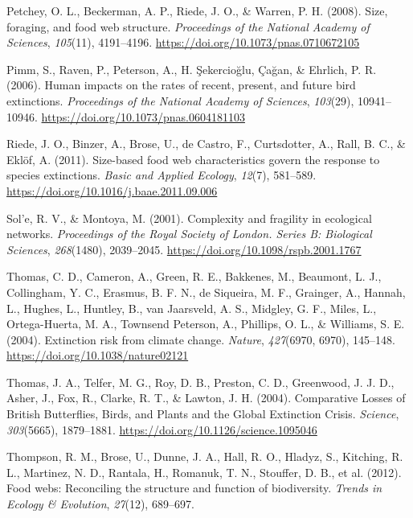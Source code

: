 \documentclass{article}
\newlength{\cslhangindent}
\newlength{\cslentryspacingunit} %
\newenvironment{CSLReferences}[2] %
 {%
  \setlength{\parindent}{0pt}
  \ifodd #1
  \let\oldpar\par
  \def\par{\hangindent=\cslhangindent\oldpar}
  \fi
  \setlength{\parskip}{#2\cslentryspacingunit}
 }%
 {}
\begin{document}
\begin{CSLReferences}{1}{0}
\leavevmode{}%
Petchey, O. L., Beckerman, A. P., Riede, J. O., \& Warren, P. H. (2008).
Size, foraging, and food web structure. \emph{Proceedings of the
National Academy of Sciences}, \emph{105}(11), 4191--4196.
\url{https://doi.org/10.1073/pnas.0710672105}

\leavevmode{}%
Pimm, S., Raven, P., Peterson, A., H. Şekercioğlu, Çağan, \& Ehrlich, P.
R. (2006). Human impacts on the rates of recent, present, and future
bird extinctions. \emph{Proceedings of the National Academy of
Sciences}, \emph{103}(29), 10941--10946.
\url{https://doi.org/10.1073/pnas.0604181103}

\leavevmode{}%
Riede, J. O., Binzer, A., Brose, U., de Castro, F., Curtsdotter, A.,
Rall, B. C., \& Eklöf, A. (2011). Size-based food web characteristics
govern the response to species extinctions. \emph{Basic and Applied
Ecology}, \emph{12}(7), 581--589.
\url{https://doi.org/10.1016/j.baae.2011.09.006}

\leavevmode{}%
Sol'e, R. V., \& Montoya, M. (2001). Complexity and fragility in
ecological networks. \emph{Proceedings of the Royal Society of London.
Series B: Biological Sciences}, \emph{268}(1480), 2039--2045.
\url{https://doi.org/10.1098/rspb.2001.1767}

\leavevmode{}%
Thomas, C. D., Cameron, A., Green, R. E., Bakkenes, M., Beaumont, L. J.,
Collingham, Y. C., Erasmus, B. F. N., de Siqueira, M. F., Grainger, A.,
Hannah, L., Hughes, L., Huntley, B., van Jaarsveld, A. S., Midgley, G.
F., Miles, L., Ortega-Huerta, M. A., Townsend Peterson, A., Phillips, O.
L., \& Williams, S. E. (2004). Extinction risk from climate change.
\emph{Nature}, \emph{427}(6970, 6970), 145--148.
\url{https://doi.org/10.1038/nature02121}

\leavevmode{}%
Thomas, J. A., Telfer, M. G., Roy, D. B., Preston, C. D., Greenwood, J.
J. D., Asher, J., Fox, R., Clarke, R. T., \& Lawton, J. H. (2004).
Comparative {Losses} of {British Butterflies}, {Birds}, and {Plants} and
the {Global Extinction Crisis}. \emph{Science}, \emph{303}(5665),
1879--1881. \url{https://doi.org/10.1126/science.1095046}

\leavevmode{}%
Thompson, R. M., Brose, U., Dunne, J. A., Hall, R. O., Hladyz, S.,
Kitching, R. L., Martinez, N. D., Rantala, H., Romanuk, T. N., Stouffer,
D. B., et al. (2012). Food webs: Reconciling the structure and function
of biodiversity. \emph{Trends in Ecology \& Evolution}, \emph{27}(12),
689--697.


\end{CSLReferences}
\end{document}
